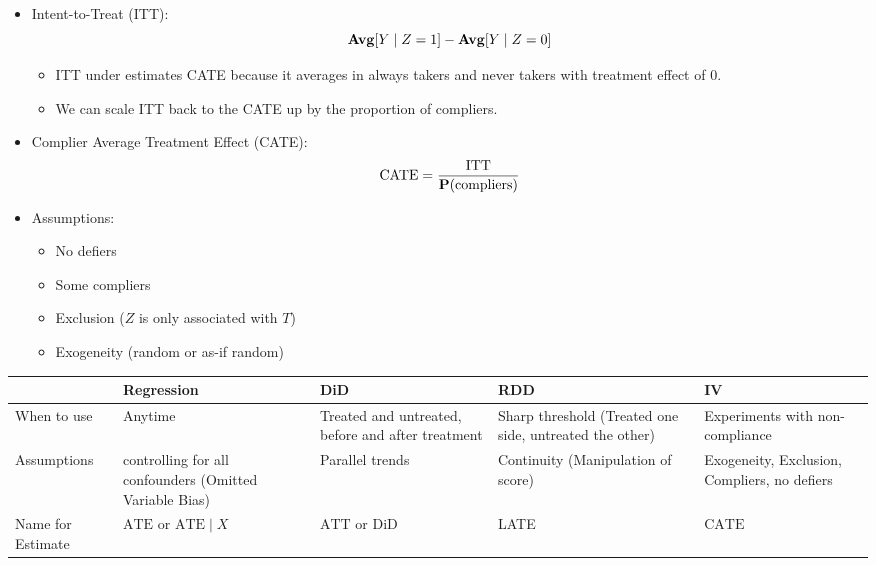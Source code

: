 \documentclass[10pt, letterpaper]{article}
\def\P{\vb{P}}
\def\Avg{\vb{Avg}}
\def\ATT{\mathrm{ATT}}
\def\ATE{\mathrm{ATE}}
\def\CATE{\mathrm{CATE}}
\def\ITT{\mathrm{ITT}}
\begin{document}
\begin{itemize}
	\item Intent-to-Treat (ITT): \[\Avg[Y\mid Z=1]-\Avg[Y\mid Z=0]\]
	\begin{itemize}
		\item ITT under estimates CATE because it averages in always takers and never takers with treatment effect of $0$.
		\item We can scale ITT back to the CATE up by the proportion of compliers.
	\end{itemize}
	\item Complier Average Treatment Effect (CATE): \[\CATE=\dfrac{\ITT}{\P(\mathrm{compliers})}\]
	\item Assumptions:
	\begin{itemize}
		\item No defiers
		\item Some compliers
		\item Exclusion ($Z$ is only associated with $T$)
		\item Exogeneity (random or as-if random)
	\end{itemize}
\end{itemize}

\begin{center}\begin{tabular}{p{3cm}|p{3cm}|p{3cm}|p{3cm}|p{3cm}}
	&Regression&DiD&RDD&IV\\\hline
	When to use&Anytime&Treated and untreated, before and after treatment&Sharp threshold (Treated one side, untreated the other)&Experiments with non-compliance\\\hline
	Assumptions&controlling for all confounders (Omitted Variable Bias)&Parallel trends&Continuity (Manipulation of score)&Exogeneity, Exclusion, Compliers, no defiers\\\hline
	Name for Estimate&$\ATE$ or $\ATE\mid X$&$\ATT$ or DiD&LATE&$\CATE$
\end{tabular}\end{center}


\label{LastPage}
\end{document}
